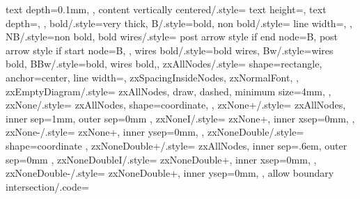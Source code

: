 {{{      text depth=0.1mm,%
    },
    content vertically centered/.style={
      text height=,
      text depth=,
    },
    bold/.style={very thick},
    B/.style={bold},
    non bold/.style={%
      line width=\zxDefaultLineWidth,
    },
    NB/.style={non bold},
    bold wires/.style={
      post arrow style if end node={B},
      post arrow style if start node={B},
    },
    wires bold/.style={bold wires},%
    Bw/.style={wires bold},
    BBw/.style={bold, wires bold,},
    zxAllNodes/.style={
      shape=rectangle, %
      anchor=center, %
      line width=\zxDefaultLineWidth,
      zxSpacingInsideNodes,
      zxNormalFont,
    },
    zxEmptyDiagram/.style={
      zxAllNodes,
      draw,
      dashed,
      minimum size=4mm,
    },
    zxNone/.style={
      zxAllNodes,
      shape=coordinate, %
    },
    zxNone+/.style={
      zxAllNodes,
      inner sep=1mm,
      outer sep=0mm
    },
    zxNoneI/.style={
      zxNone+,
      inner xsep=0mm,
    },
    zxNone-/.style={
      zxNone+,
      inner ysep=0mm,
    },
    zxNoneDouble/.style={
      shape=coordinate
    },
    zxNoneDouble+/.style={
      zxAllNodes,
      inner sep=.6em,
      outer sep=0mm
    },
    zxNoneDoubleI/.style={
      zxNoneDouble+,
      inner xsep=0mm,
    },
    zxNoneDouble-/.style={
      zxNoneDouble+,
      inner ysep=0mm,
    },
    allow boundary intersection/.code={%
      \ifdefined\zxEnableIntersectionsNodes%
}}}
